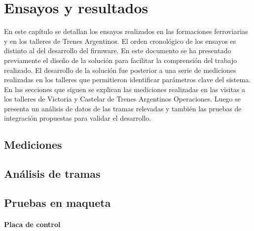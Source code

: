 
\chapter{Ensayos y resultados} %
En este capítulo se detallan los ensayos realizados en las formaciones ferroviarias y en los talleres de Trenes Argentinos. El orden cronológico de los ensayos es distinto al del desarrollo del firmware. En este documento se ha presentado previamente el diseño de la solución para facilitar la comprensión del trabajo realizado. El desarrollo de la solución fue posterior a una serie de mediciones realizadas en los talleres que permitieron identificar parámetros clave del sistema. \\

En las secciones que siguen se explican las mediciones realizadas en las visitas a los talleres de Victoria y Castelar de Trenes Argentinos Operaciones. Luego se presenta un análisis de datos de las tramas relevadas y también las pruebas de integración propuestas para validar el desarrollo. \\


\label{Chapter4} %


\section{Mediciones}
\pagebreak

\section{Análisis de tramas}

\pagebreak
\section{Pruebas en maqueta}

\subsubsection{Placa de control}

